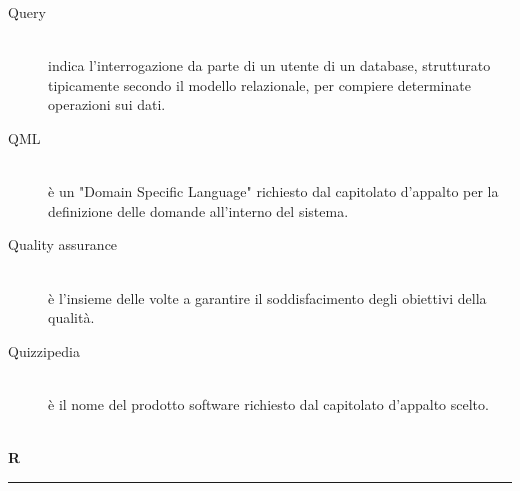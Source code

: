 \documentclass[12pt,a4paper]{article}
\begin{document}
\begin{description}
\item[Query] 
\hfill\\indica l'interrogazione da parte di un utente di un database, strutturato tipicamente secondo il modello relazionale, per compiere determinate operazioni sui dati.
\item[QML] 
\hfill\\ è un "Domain Specific Language" richiesto dal capitolato d'appalto per la definizione delle domande all'interno del sistema.

\item[Quality assurance] 
\hfill\\ è l'insieme delle  volte a garantire il soddisfacimento degli obiettivi della qualità.

\item[Quizzipedia] 
\hfill\\ è il nome del prodotto software richiesto dal capitolato d'appalto scelto.
\end{description}

\newpage

\begin{center}
\hfill\\
	\LARGE \textbf{R}
\hfill\\
\rule[15pt]{30pt}{0.5pt}
\end{center}
\end{document}

